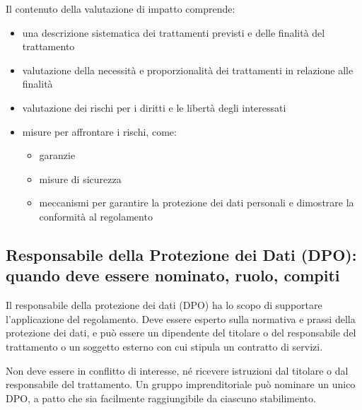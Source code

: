 Il contenuto della valutazione di impatto comprende:
\begin{itemize}
    \item una descrizione sistematica dei trattamenti previsti e delle finalità del trattamento
    \item valutazione della necessità e proporzionalità dei trattamenti in relazione alle finalità
    \item valutazione dei rischi per i diritti e le libertà degli interessati
    \item misure per affrontare i rischi, come:
    \begin{itemize}
        \item garanzie
        \item misure di sicurezza
        \item meccanismi per garantire la protezione dei dati personali e dimostrare la conformità al regolamento
    \end{itemize}
\end{itemize}

\subsection{Responsabile della Protezione dei Dati (DPO): quando deve essere nominato, ruolo, compiti}

Il responsabile della protezione dei dati (DPO) ha lo scopo di supportare l'applicazione del regolamento.
Deve essere esperto sulla normativa e prassi della protezione dei dati, e può essere un dipendente del titolare o del responsabile del trattamento o un soggetto esterno con cui stipula un contratto di servizi.

Non deve essere in conflitto di interesse, né ricevere istruzioni dal titolare o dal responsabile del trattamento.
Un gruppo imprenditoriale può nominare un unico DPO, a patto che sia facilmente raggiungibile da ciascuno stabilimento.

